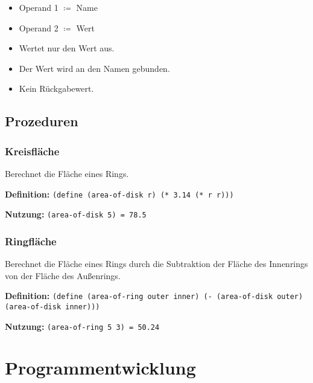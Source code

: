 \documentclass[12pt]{scrreprt}
\begin{document}
                \begin{itemize}
                    \item Operand 1 $ \coloneqq $ Name
                    \item Operand 2 $ \coloneqq $ Wert
                    \item Wertet nur den Wert aus.
                    \item Der Wert wird an den Namen gebunden.
                    \item Kein Rückgabewert.
                \end{itemize}


            \subsection{Prozeduren}
                \label{ss:drracket_struktur_prozeduren}

                \subsubsection{Kreisfläche}
                    \label{sss:drracket_struktur_prozeduren_kreisflaeche}

                    Berechnet die Fläche eines Rings.

                    \textbf{Definition:} \texttt{(define (area-of-disk r) (* 3.14 (* r r)))}

                    \textbf{Nutzung:} \texttt{(area-of-disk 5) = 78.5}


                \subsubsection{Ringfläche}
                    \label{sss:drracket_struktur_prozeduren_ringflaeche}

                    Berechnet die Fläche eines Rings durch die Subtraktion der Fläche des Innenrings von der Fläche des Außenrings.

                    \textbf{Definition:} \texttt{(define (area-of-ring outer inner) (- (area-of-disk outer) (area-of-disk inner)))}

                    \textbf{Nutzung:} \texttt{(area-of-ring 5 3) = 50.24}


        \section{Programmentwicklung}
            \label{s:drracket_entwicklung}
\end{document}
